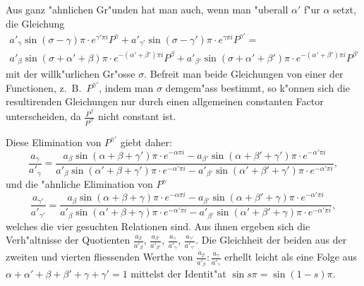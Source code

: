 \documentclass[12pt,a4paper]{article}
\begin{document}
Aus ganz {"a}hnlichen Gr{"u}nden hat man auch, wenn man {"u}berall $\alpha'$ f{"u}r $\alpha$ setzt, die Gleichung
\begin{multline*}
a'_{\gamma} \sin(\sigma - \gamma)\pi \cdot e^{\gamma'\pi i} P^{\gamma} + a'_{\gamma'} \sin(\sigma - \gamma')\pi \cdot e^{\gamma\pi i} P^{\gamma'} = \\
a'_{\beta} \sin(\sigma + \alpha' + \beta)\pi \cdot e^{-(\alpha'+\beta')\pi i} P^{\beta} + a'_{\beta'} \sin(\sigma + \alpha' + \beta')\pi \cdot e^{-(\alpha'+\beta')\pi i} P^{\beta'}
\end{multline*}
mit der willk{"u}rlichen Gr{"o}sse $\sigma$. Befreit man beide Gleichungen von einer der Functionen, z.~B.\ $P^{\gamma'}$, indem man $\sigma$ demgem{"a}ss bestimmt, so k{"o}nnen sich die resultirenden Gleichungen nur durch einen allgemeinen constanten Factor unterscheiden, da $\frac{P^{\beta}}{P^{\beta'}}$ nicht constant ist.

Diese Elimination von $P^{\gamma'}$ giebt daher:
\begin{equation}
\frac{a_{\gamma}}{a'_{\gamma}} = \frac{a_{\beta} \sin(\alpha+\beta+\gamma')\pi \cdot e^{-\alpha\pi i} - a_{\beta'} \sin(\alpha+\beta'+\gamma')\pi \cdot e^{-\alpha'\pi i}}{a'_{\beta} \sin(\alpha'+\beta+\gamma')\pi \cdot e^{-\alpha'\pi i} - a'_{\beta'} \sin(\alpha'+\beta'+\gamma')\pi \cdot e^{-\alpha'\pi i}}, \tag{3}
\end{equation}
und die {"a}hnliche Elimination von $P^{\gamma}$
\begin{equation}
\frac{a_{\gamma'}}{a'_{\gamma'}} = \frac{a_{\beta} \sin(\alpha+\beta+\gamma)\pi \cdot e^{-\alpha\pi i} - a_{\beta'} \sin(\alpha+\beta'+\gamma)\pi \cdot e^{-\alpha'\pi i}}{a'_{\beta} \sin(\alpha'+\beta+\gamma)\pi \cdot e^{-\alpha'\pi i} - a'_{\beta'} \sin(\alpha'+\beta'+\gamma)\pi \cdot e^{-\alpha'\pi i}}, \tag{4}
\end{equation}
welches die vier gesuchten Relationen sind. Aus ihnen ergeben sich die Verh{"a}ltnisse der Quotienten $\frac{a_{\beta}}{a'_{\beta}}$, $\frac{a_{\beta'}}{a'_{\beta'}}$, $\frac{a_{\gamma}}{a'_{\gamma}}$, $\frac{a_{\gamma'}}{a'_{\gamma'}}$. Die Gleichheit der beiden aus der zweiten und vierten fliessenden Werthe von $\frac{a_{\beta}}{a'_{\beta}} : \frac{a_{\gamma}}{a'_{\gamma}}$ erhellt leicht als eine Folge aus $\alpha + \alpha' + \beta + \beta' + \gamma + \gamma' = 1$ mittelst der Identit{"a}t $\sin s\pi = \sin(1-s)\pi$.
\end{document}
